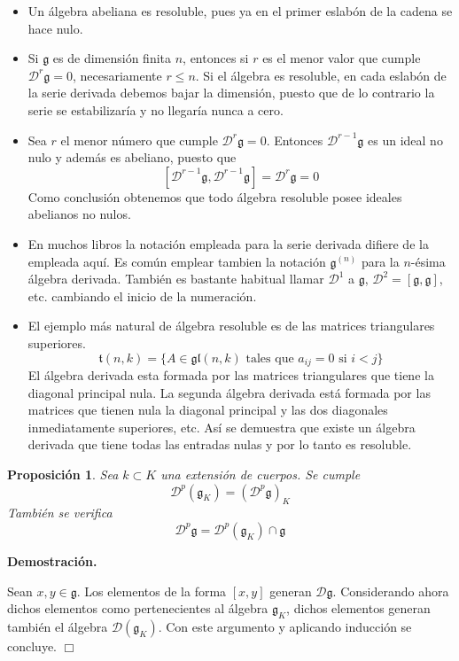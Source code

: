 \documentclass[a4paper,draft,12pt]{scrartcl}
\newtheorem{propo}[teo]{Proposición}%
\newcommand{\dem}{\noindent \textbf{Demostración. }\vspace{0.3 cm}}%
\newcommand{\g}{\mathfrak{g}}%
\newcommand{\fin}{ $\Box $ \vspace{0.4 cm}}
\newcommand{\D}{\mathcal{D}}%
\begin{document}
\begin{itemize}


\item Un álgebra abeliana es resoluble, pues ya en el primer eslabón de la cadena se hace nulo.

\item Si $\g$ es de dimensión finita $n$, entonces si $r$ es el menor valor que cumple $\D^r\g=0$, necesariamente $r\leq n$. Si el álgebra es resoluble,  en cada eslabón de la serie derivada debemos bajar la dimensión, puesto que de lo contrario la serie se estabilizaría y no llegaría nunca a cero.

\item Sea $r$ el menor número que cumple $\D^r\g=0$.  Entonces $\D^{r-1}\g$ es un ideal no nulo y además es abeliano, puesto que 
$$
[\D^{r-1}\g,\D^{r-1}\g] = \D^r\g =0
$$
Como conclusión obtenemos que todo álgebra resoluble posee ideales abelianos no nulos.



\item  En muchos libros la notación empleada para la serie derivada difiere de la empleada aquí.  Es común emplear tambien la notación $\g^{(n)}$ para la $n$-ésima álgebra derivada. También es bastante habitual llamar $\D^1$ a $\g$, $\D^2 =[\g,\g]$, etc. cambiando el inicio de la numeración.  

\item El ejemplo más natural de álgebra resoluble es de las matrices triangulares superiores. 
$$
\mathfrak{t}(n,k)= \{ A \in \mathfrak{gl}(n,k) \text{ tales que } a_{ij}=0 \text{ si } i<j\}
$$ 
El álgebra derivada esta formada por las matrices triangulares que tiene la diagonal principal nula.  La segunda álgebra derivada está formada por las matrices que tienen nula la diagonal principal y las dos diagonales inmediatamente superiores, etc.  Así  se demuestra que existe un álgebra derivada que tiene todas las entradas nulas y por lo tanto es resoluble.


\end{itemize}

\begin{propo}

Sea $k \subset K$ una extensión de cuerpos. Se cumple
$$
\D^p(\g_K)= (\D^p\g)_K
$$
También se verifica
$$
\D^p\g= \D^p(\g_K) \cap \g
$$

\end{propo}


\dem

Sean $x,y \in \g$. Los elementos de la forma $[x,y]$ generan $\D\g$.  Considerando ahora dichos elementos como pertenecientes al álgebra $\g_K$, dichos elementos generan también el álgebra $\D(\g_K)$.  Con este argumento y aplicando inducción se concluye. \fin
\end{document}
